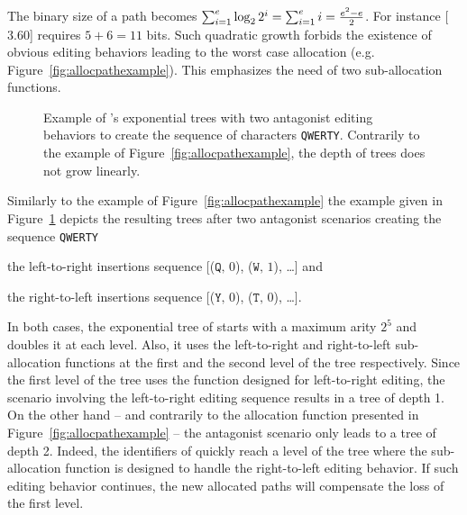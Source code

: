 \noindent The binary size of a path becomes
$\textstyle\sum\nolimits_{i=1}^{e}\log_2{2^i}=\sum\nolimits_{i=1}^{e}i=
{e^2-e\over{2}}$.
For instance [$3.60$] requires $5 + 6 = 11$ bits.  Such quadratic growth forbids
the existence of obvious editing behaviors leading to the worst case allocation
(e.g. Figure~\ref{fig:allocpathexample}). This emphasizes the need of two
sub-allocation functions.

\begin{figure}
  \centering
  \caption{\label{fig:lseqtreeexample} Example of \LSEQ's exponential trees with
    two antagonist editing behaviors to create the sequence of characters
    \texttt{QWERTY}. Contrarily to the example of
    Figure~\ref{fig:allocpathexample}, the depth of trees does not grow
    linearly.}
\end{figure}


Similarly to the example of Figure~\ref{fig:allocpathexample} the example given
in Figure~\ref{fig:lseqtreeexample} depicts the resulting trees after two
antagonist scenarios creating the sequence \texttt{QWERTY}
\begin{inparaenum}[(i)]
\item the left-to-right insertions sequence [($\texttt{Q},\,0$), ($\texttt{W},\,1$),
  \ldots] and
\item the right-to-left insertions sequence [($\texttt{Y},\,0$),
  ($\texttt{T},\,0$), \ldots].
\end{inparaenum}
In both cases, the exponential tree of \LSEQ starts with a maximum arity $2^5$
and doubles it at each level. Also, it uses the left-to-right and right-to-left
sub-allocation functions at the first and the second level of the tree
respectively. Since the first level of the tree uses the function designed for
left-to-right editing, the scenario involving the left-to-right editing sequence
results in a tree of depth 1. On the other hand -- and contrarily to the
allocation function presented in Figure~\ref{fig:allocpathexample} -- the
antagonist scenario only leads to a tree of depth 2. Indeed, the identifiers of
\LSEQ quickly reach a level of the tree where the sub-allocation function is
designed to handle the right-to-left editing behavior. If such editing behavior
continues, the new allocated paths will compensate the loss of the first level.

